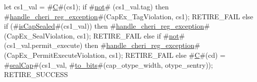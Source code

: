 let cs1_val = #\hyperref[sailRISCVzC]{C}#(cs1);
if #\hyperref[sailRISCVznot]{not}# (cs1_val.tag) then {
  #\hyperref[sailRISCVzhandlezycherizyregzyexception]{handle\_cheri\_reg\_exception}#(CapEx_TagViolation, cs1);
  RETIRE_FAIL
} else if (#\hyperref[sailRISCVzisCapSealed]{isCapSealed}#(cs1_val)) then {
  #\hyperref[sailRISCVzhandlezycherizyregzyexception]{handle\_cheri\_reg\_exception}#(CapEx_SealViolation, cs1);
  RETIRE_FAIL
} else if #\hyperref[sailRISCVznot]{not}# (cs1_val.permit_execute) then {
  #\hyperref[sailRISCVzhandlezycherizyregzyexception]{handle\_cheri\_reg\_exception}#(CapEx_PermitExecuteViolation, cs1);
  RETIRE_FAIL
} else {
  #\hyperref[sailRISCVzC]{C}#(cd) = #\hyperref[sailRISCVzsealCap]{sealCap}#(cs1_val, #\hyperref[sailRISCVztozybits]{to\_bits}#(cap_otype_width, otype_sentry));
  RETIRE_SUCCESS
}
